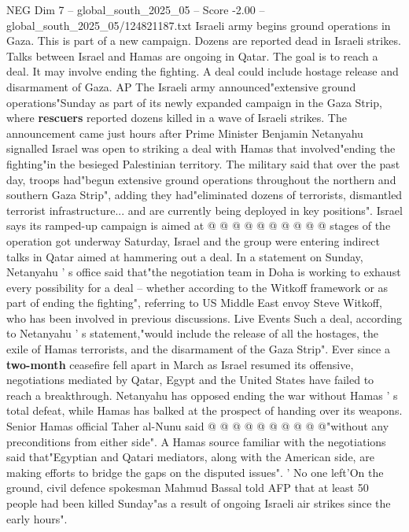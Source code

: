 \begin{textsample}{NEG Dim 7 – global\_south\_2025\_05 – Score -2.00 – global\_south\_2025\_05/124821187.txt}  \label{ex:f7_neg_005}
Israeli army begins ground operations in Gaza.
This is part of a new campaign.
Dozens are reported dead in Israeli strikes.
Talks between Israel and Hamas are ongoing in Qatar.
The goal is to reach a deal.
It may involve ending the fighting.
A deal could include hostage release and disarmament of Gaza.
AP The Israeli army announced"extensive ground operations"Sunday as part of its newly expanded campaign in the Gaza Strip, where \textbf{rescuers} reported dozens killed in a wave of Israeli strikes.
The announcement came just hours after Prime Minister Benjamin Netanyahu signalled Israel was open to striking a deal with Hamas that involved"ending the fighting"in the besieged Palestinian territory.
The military said that over the past day, troops had"begun extensive ground operations throughout the northern and southern Gaza Strip", adding they had"eliminated dozens of terrorists, dismantled terrorist infrastructure... and are currently being deployed in key positions".
Israel says its ramped-up campaign is aimed at @ @ @ @ @ @ @ @ @ @ stages of the operation got underway Saturday, Israel and the group were entering indirect talks in Qatar aimed at hammering out a deal.
In a statement on Sunday, Netanyahu ' s office said that"the negotiation team in Doha is working to exhaust every possibility for a deal -- whether according to the Witkoff framework or as part of ending the fighting", referring to US Middle East envoy Steve Witkoff, who has been involved in previous discussions.
Live Events Such a deal, according to Netanyahu ' s statement,"would include the release of all the hostages, the exile of Hamas terrorists, and the disarmament of the Gaza Strip".
Ever since a \textbf{two-month} ceasefire fell apart in March as Israel resumed its offensive, negotiations mediated by Qatar, Egypt and the United States have failed to reach a breakthrough.
Netanyahu has opposed ending the war without Hamas ' s total defeat, while Hamas has balked at the prospect of handing over its weapons.
Senior Hamas official Taher al-Nunu said @ @ @ @ @ @ @ @ @ @"without any preconditions from either side".
A Hamas source familiar with the negotiations said that"Egyptian and Qatari mediators, along with the American side, are making efforts to bridge the gaps on the disputed issues". ' No one left'On the ground, civil defence spokesman Mahmud Bassal told AFP that at least 50 people had been killed Sunday"as a result of ongoing Israeli air strikes since the early hours".

\end{textsample}
